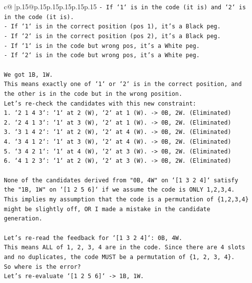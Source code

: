 \documentclass{article}
\begin{document}
{\begin{supertabular}{c@{$\;$}|p{.15\linewidth}@{}p{.15\linewidth}p{.15\linewidth}p{.15\linewidth}p{.15\linewidth}p{.15\linewidth}}
{{{\texttt{{-} If `1` is in the code (it is) and `2` is in the code (it is).} \\
\texttt{{-} If `1` is in the correct position (pos 1), it's a Black peg.} \\
\texttt{{-} If `2` is in the correct position (pos 2), it's a Black peg.} \\
\texttt{{-} If `1` is in the code but wrong pos, it's a White peg.} \\
\texttt{{-} If `2` is in the code but wrong pos, it's a White peg.} \\
\\ 
\texttt{We got 1B, 1W.} \\
\texttt{This means exactly one of `1` or `2` is in the correct position, and the other is in the code but in the wrong position.} \\
\texttt{Let's re{-}check the candidates with this new constraint:} \\
\texttt{1. `2 1 4 3`: `1` at 2 (W), `2` at 1 (W). {-}> 0B, 2W. (Eliminated)} \\
\texttt{2. `2 4 1 3`: `1` at 3 (W), `2` at 1 (W). {-}> 0B, 2W. (Eliminated)} \\
\texttt{3. `3 1 4 2`: `1` at 2 (W), `2` at 4 (W). {-}> 0B, 2W. (Eliminated)} \\
\texttt{4. `3 4 1 2`: `1` at 3 (W), `2` at 4 (W). {-}> 0B, 2W. (Eliminated)} \\
\texttt{5. `3 4 2 1`: `1` at 4 (W), `2` at 3 (W). {-}> 0B, 2W. (Eliminated)} \\
\texttt{6. `4 1 2 3`: `1` at 2 (W), `2` at 3 (W). {-}> 0B, 2W. (Eliminated)} \\
\\ 
\texttt{None of the candidates derived from "0B, 4W" on `{[}1 3 2 4{]}` satisfy the "1B, 1W" on `{[}1 2 5 6{]}` if we assume the code is ONLY 1,2,3,4.} \\
\texttt{This implies my assumption that the code is a permutation of \{1,2,3,4\} might be slightly off, OR I made a mistake in the candidate generation.} \\
\\ 
\texttt{Let's re{-}read the feedback for `{[}1 3 2 4{]}`: 0B, 4W.} \\
\texttt{This means ALL of 1, 2, 3, 4 are in the code. Since there are 4 slots and no duplicates, the code MUST be a permutation of \{1, 2, 3, 4\}.} \\
\texttt{So where is the error?} \\
\texttt{Let's re{-}evaluate `{[}1 2 5 6{]}` {-}> 1B, 1W.} \\
}}}
\end{supertabular}}
\end{document}
